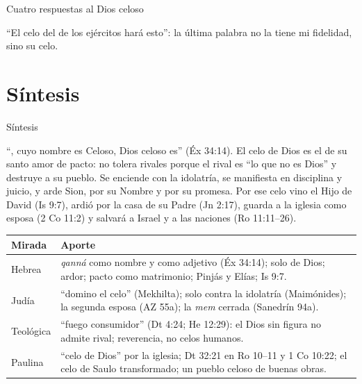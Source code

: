 \begin{frame}{Cuatro respuestas al Dios celoso}
\centering
{}\par\medskip
\small\RaggedRight ``El celo del \SENOR{} de los ejércitos hará esto'': la última palabra no la tiene mi fidelidad, sino su celo.
\end{frame}

\section{Síntesis}

\begin{frame}{Síntesis}
\begin{tcolorbox}[colback=papiro,colframe=azul,boxrule=1pt,arc=3pt]
\small ``\SENOR, cuyo nombre es Celoso, Dios celoso es'' (Éx 34:14). El celo de Dios es el  de su santo amor de pacto: no tolera rivales porque el rival es ``lo que no es Dios'' y destruye a su pueblo. Se enciende con la idolatría, se manifiesta en disciplina y juicio, y arde  Sion, por su Nombre y por su promesa. Por ese celo vino el Hijo de David (Is 9:7), ardió por la casa de su Padre (Jn 2:17), guarda a la iglesia como esposa (2 Co 11:2) y salvará a Israel y a las naciones (Ro 11:11--26).
\end{tcolorbox}
\scriptsize\renewcommand{\arraystretch}{1.15}
\begin{tabular}{@{}>{\RaggedRight\arraybackslash}p{2.4cm}>{\RaggedRight\arraybackslash}p{9.4cm}@{}}
\toprule
\textbf{Mirada} & \textbf{Aporte} \\ \midrule
Hebrea & \emph{qanná} como nombre y como adjetivo (Éx 34:14); solo de Dios; ardor; pacto como matrimonio; Pinjás y Elías; Is 9:7. \\
Judía & ``domino el celo'' (Mekhilta); solo contra la idolatría (Maimónides); la segunda esposa (AZ 55a); la \emph{mem} cerrada (Sanedrín 94a). \\
Teológica & ``fuego consumidor'' (Dt 4:24; He 12:29): el Dios sin figura no admite rival; reverencia, no celos humanos. \\
Paulina & ``celo de Dios'' por la iglesia; Dt 32:21 en Ro 10--11 y 1 Co 10:22; el celo de Saulo transformado; un pueblo celoso de buenas obras. \\
\bottomrule
\end{tabular}
\end{frame}

